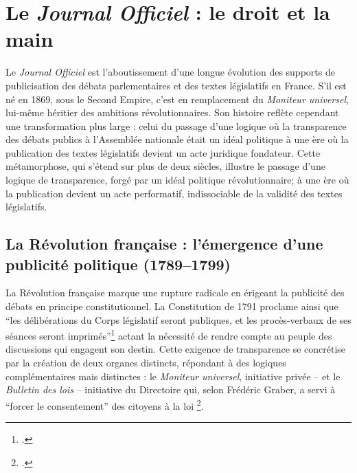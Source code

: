 \section{Le \emph{Journal Officiel} : le droit et la main}

Le \emph{Journal Officiel} est l’aboutissement d’une longue évolution des supports de publicisation des débats parlementaires et des textes législatifs en France. S'il est né en 1869, sous le Second Empire, c'est en remplacement du \emph{Moniteur universel}, lui-même héritier des ambitions révolutionnaires. Son histoire reflète cependant une transformation plus large : celui du passage d’une logique où la transparence des débats publics à l'Assemblée nationale était un idéal politique à une ère où la publication des textes législatifs devient un acte juridique fondateur. Cette métamorphose, qui s’étend sur plus de deux siècles, illustre le passage d’une logique de transparence, forgé par un idéal politique révolutionnaire; à une ère où la publication devient un acte performatif, indissociable de la validité des textes législatifs.

\subsection{La Révolution française : l’émergence d’une publicité politique (1789–1799)}

La Révolution française marque une rupture radicale en érigeant la publicité des débats en principe constitutionnel. La Constitution de 1791 proclame ainsi que \enquote{les délibérations du Corps législatif seront publiques, et les procès-verbaux de ses séances seront imprimés}\footcite[][]{constitution} actant la nécessité de rendre compte au peuple des discussions qui engagent son destin. Cette exigence de transparence se concrétise par la création de deux organes distincts, répondant à des logiques complémentaires mais distinctes : le \emph{Moniteur universel}, initiative privée -- et le \emph{Bulletin des lois} -- initiative du Directoire qui, selon Frédéric Graber, a servi à \enquote{forcer le consentement} des citoyens à la loi \footcite[][]{graber}. 

